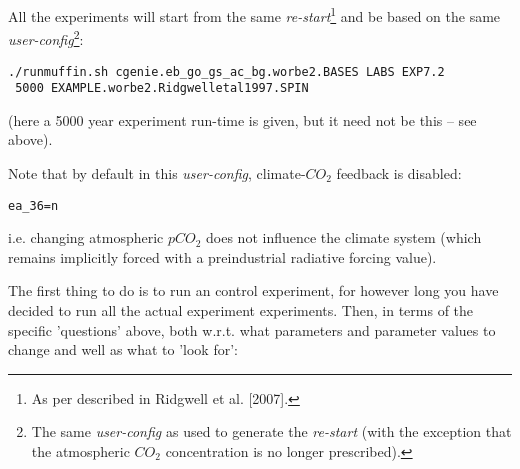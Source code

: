 \documentclass[11pt,fleqn]{book} %
\begin{document}
All the experiments will start from the same \textit{re-start}\footnote{As per described in Ridgwell et al. [2007].} and be based on the same \textit{user-config}\footnote{The same \textit{user-config} as used to generate the \textit{re-start} (with the exception that the atmospheric \(CO_{2}\) concentration is no longer prescribed).}:

\vspace{-2pt}\begin{verbatim}
./runmuffin.sh cgenie.eb_go_gs_ac_bg.worbe2.BASES LABS EXP7.2
 5000 EXAMPLE.worbe2.Ridgwelletal1997.SPIN
\end{verbatim}\vspace{-2pt}
(here a 5000 year experiment run-time is given, but it need not be this -- see above).

Note that by default in this \textit{user-config}, climate-\(CO_{2}\) feedback is disabled:
\vspace{-2pt}\begin{verbatim}
ea_36=n
\end{verbatim}\vspace{-2pt}
i.e. changing atmospheric \(pCO_{2}\) does not influence the climate system (which remains implicitly forced with a preindustrial radiative forcing value).

\pagebreak

The first thing to do is to run an control experiment, for however long you have decided to run all the actual experiment experiments. Then, in terms of the specific 'questions' above, both w.r.t. what parameters and parameter values to change and well as what to 'look for':
\end{document}
